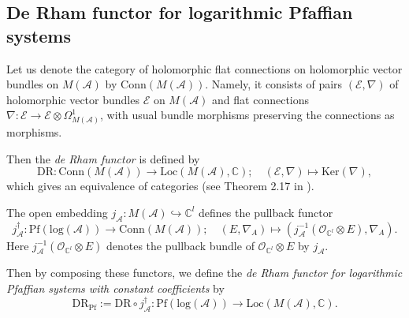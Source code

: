 \documentclass[a4paper,12pt]{article}
\theoremstyle{definition}
\theoremstyle{remark}
\begin{document}
\subsection{De Rham functor for logarithmic Pfaffian systems}
Let us denote the category of holomorphic flat connections on holomorphic vector bundles on $M(\mathcal{A})$
by $\mathrm{Conn}(M(\mathcal{A}))$.
Namely, it consists of pairs $(\mathcal{E},\nabla)$ of holomorphic vector bundles $\mathcal{E}$ on $M(\mathcal{A})$
and flat connections $\nabla\colon \mathcal{E}\rightarrow \mathcal{E}\otimes \varOmega_{M(\mathcal{A})}^{1}$,
with usual bundle morphisms preserving the connections as morphisms.

Then the {\em de Rham functor} is defined by 
\[
	\mathrm{DR}\colon \mathrm{Conn}(M(\mathcal{A}))
	\longrightarrow \mathrm{Loc}(M(\mathcal{A}),\mathbb{C});\quad 
	(\mathcal{E},\nabla)
	\longmapsto
	\mathrm{Ker}(\nabla),
\]
which gives an equivalence of categories (see Theorem 2.17 in \cite{DelEDR}).

The open embedding $j_{\mathcal{A}}\colon M(\mathcal{A})\hookrightarrow \mathbb{C}^{l}$
defines the pullback functor
\[
	j_{\mathcal{A}}^{\dagger}\colon \mathrm{Pf}(\mathrm{log}(\mathcal{A}))
	\longrightarrow 
	\mathrm{Conn}(M(\mathcal{A}));\quad 
	(E,\nabla_{A})
	\longmapsto
	(j_{\mathcal{A}}^{-1}(\mathcal{O}_{\mathbb{C}^{l}}\otimes E),\nabla_{A}).
\]
Here $j_{\mathcal{A}}^{-1}(\mathcal{O}_{\mathbb{C}^{l}}\otimes E)$
denotes the pullback bundle of 
$\mathcal{O}_{\mathbb{C}^{l}}\otimes E$ by $j_{\mathcal{A}}$.

Then by composing these functors,
we define the {\em de Rham functor for logarithmic Pfaffian systems with constant coefficients} by
\[
	\mathrm{DR}_{\mathrm{Pf}}:=\mathrm{DR}\circ j^{\dagger}_{\mathcal{A}}\colon \mathrm{Pf}(\mathrm{log}(\mathcal{A}))
	\longrightarrow 
	\mathrm{Loc}(M(\mathcal{A}),\mathbb{C}).
\]
\end{document}
